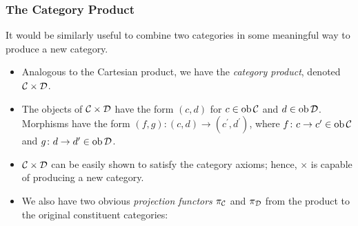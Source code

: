 \documentclass{beamer}
\numberwithin{figure}{section}
\begin{document}
\begin{frame}
        \frametitle{The Category Product}
        It would be similarly useful to combine two categories in some
        meaningful way to produce a new category.
        \pause
        \begin{itemize}
                \item Analogous to the Cartesian product, we have the
                        \emph{category product}, denoted $\mathcal{C} \times
                        \mathcal{D}$.
                \item The objects of $\mathcal{C} \times \mathcal{D}$ have the
                        form $(c,d)$ for $c \in \operatorname{ob} \mathcal{C}$ and $d \in
                        \operatorname{ob} \mathcal{D}$. Morphisms have the form $(f,g)
                        \colon (c,d) \to (c^\prime,d^\prime)$, where
                        $f \colon c \to c^\prime \in \operatorname{ob} \mathcal{C}$ and
                        $g \colon d \to d^\prime \in \operatorname{ob} \mathcal{D}$.
                \item $\mathcal{C} \times \mathcal{D}$ can be easily shown to
                        satisfy the category axioms; hence, $\times$ is capable
                        of producing a new category.
                \item We also have two obvious \emph{projection functors}
                        $\pi_\mathcal{C}$ and $\pi_\mathcal{D}$ from the product
                        to the original constituent categories:

                        \vspace{1em}
                        \begin{figure}
                        \end{figure}
        \end{itemize}
\end{frame}
\end{document}

